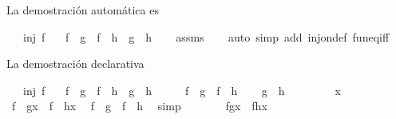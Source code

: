 \begin{isabellebody}
\begin{isamarkuptext}
  La demostración automática es%
\end{isamarkuptext}\isamarkuptrue%
\isamarkupfalse%
\isanewline
\ \ \ {\isachardoublequoteopen}inj\ f{\isachardoublequoteclose}\isanewline
\ \ \ {\isachardoublequoteopen}{\isacharparenleft}f\ {\isasymcirc}\ g\ {\isacharequal}\ f\ {\isasymcirc}\ h{\isacharparenright}\ {\isacharequal}\ {\isacharparenleft}g\ {\isacharequal}\ h{\isacharparenright}{\isachardoublequoteclose}\isanewline
%
\isadelimproof
\ \ %
\endisadelimproof
%
\isatagproof
{}\isamarkupfalse%
\ assms\isanewline
\ \ \isamarkupfalse%
\ {\isacharparenleft}auto\ simp\ add{\isacharcolon}\ inj{\isacharunderscore}on{\isacharunderscore}def\ fun{\isacharunderscore}eq{\isacharunderscore}iff{\isacharparenright}%
\endisatagproof
{\isafoldproof}%
%
\isadelimproof
%
\endisadelimproof
%
\begin{isamarkuptext}%
La demostración declarativa%
\end{isamarkuptext}\isamarkuptrue%
\isamarkupfalse%
\isanewline
\ \ \ {\isachardoublequoteopen}inj\ f{\isachardoublequoteclose}\isanewline
\ \ \ {\isachardoublequoteopen}{\isacharparenleft}f\ {\isasymcirc}\ g\ {\isacharequal}\ f\ {\isasymcirc}\ h{\isacharparenright}\ {\isacharequal}\ {\isacharparenleft}g\ {\isacharequal}\ h{\isacharparenright}{\isachardoublequoteclose}\isanewline
%
\isadelimproof
%
\endisadelimproof
%
\isatagproof
{}\isamarkupfalse%
\ \isanewline
\ \ \isamarkupfalse%
\ {\isachardoublequoteopen}f\ {\isasymcirc}\ g\ {\isacharequal}\ f\ {\isasymcirc}\ h{\isachardoublequoteclose}\isanewline
\ \ \isamarkupfalse%
\ {\isachardoublequoteopen}g\ {\isacharequal}\ h{\isachardoublequoteclose}\isanewline
\ \ \isamarkupfalse%
\isanewline
\ \ \ \ \isamarkupfalse%
\ x\isanewline
\ \ \ \ \isamarkupfalse%
\ {\isachardoublequoteopen}{\isacharparenleft}f\ {\isasymcirc}\ g{\isacharparenright}{\isacharparenleft}x{\isacharparenright}\ {\isacharequal}\ {\isacharparenleft}f\ {\isasymcirc}\ h{\isacharparenright}{\isacharparenleft}x{\isacharparenright}{\isachardoublequoteclose}\ \isamarkupfalse%
\ {\isacharbackquoteopen}f\ {\isasymcirc}\ g\ {\isacharequal}\ f\ {\isasymcirc}\ h{\isacharbackquoteclose}\ \isamarkupfalse%
\ simp\isanewline
\ \ \ \ \isamarkupfalse%
\ \isamarkupfalse%
\ {\isachardoublequoteopen}f{\isacharparenleft}g{\isacharparenleft}x{\isacharparenright}{\isacharparenright}\ {\isacharequal}\ f{\isacharparenleft}h{\isacharparenleft}x{\isacharparenright}{\isacharparenright}{\isachardoublequoteclose}\ \isamarkupfalse%

\end{isabellebody}
